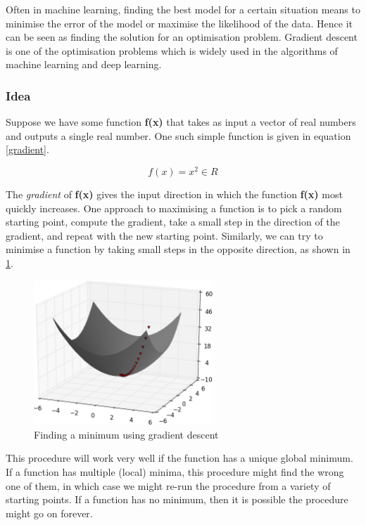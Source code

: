 \documentclass[a4paper, 12pt, oneside, BCOR1cm,toc=chapterentrywithdots]{scrbook}
\begin{document}
Often in machine learning, finding the best model for a certain situation means to minimise the error of the model or maximise the likelihood of the data. Hence it can be seen as finding the solution for an optimisation problem. Gradient descent is one of the optimisation problems which is widely used in the algorithms of machine learning and deep learning. 

\subsubsection{Idea}

Suppose we have some function \textbf{f(x)} that takes as input a vector of real numbers and outputs a single real number. One such simple function is given in equation \ref{gradient}. 

\begin{equation} \label{gradient}
f(x) = x^2  \in R
\end{equation}

The \textit{gradient} of \textbf{f(x)} gives the input direction in which the function \textbf{f(x)} most quickly increases. One approach to maximising a function is to pick a random starting point, compute the gradient, take a small step in the direction of the gradient, and repeat with the new starting point. Similarly, we can try to minimise a function by taking small steps in the opposite direction, as shown in \ref{fig:pic0}. 

\begin{figure}[h]
\centering
\includegraphics[width=0.6\textwidth]{image1.png}
\caption{Finding a minimum using gradient descent}
\label{fig:pic0}
\end{figure}

This procedure will work very well if the function has a unique global minimum. If a function has multiple (local) minima, this procedure might find the wrong one of them, in which case we might re-run the procedure from a variety of starting points. If a function has no minimum, then it is possible the procedure might go on forever.
\end{document}
